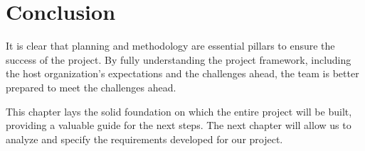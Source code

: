 \section*{Conclusion}

It is clear that planning and methodology are essential pillars to ensure the success of the project. By fully understanding the project framework, including the host organization's expectations and the challenges ahead, the team is better prepared to meet the challenges ahead.

This chapter lays the solid foundation on which the entire project will be built, providing a valuable guide for the next steps. The next chapter will allow us to analyze and specify the requirements developed for our project. 